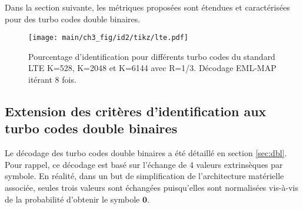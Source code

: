 Dans la section suivante, les métriques proposées sont étendues et caractérisées pour des turbo codes double 
binaires.

\begin{figure}[!h]
	\centering
	\hspace*{-1cm}
	\texttt{[image: main/ch3\_fig/id2/tikz/lte.pdf]}
	\caption{Pourcentage d'identification pour différents turbo codes du standard LTE K=528, K=2048 et K=6144 avec R=1/3.
	Décodage EML-MAP itérant 8 fois. \label{fig:idLTE}}
\end{figure}

\subsection{Extension des critères d'identification aux turbo codes double binaires}
Le décodage des turbo codes double binaires a été détaillé en section \ref{sec:dbl}. Pour rappel, ce décodage est basé
sur l'échange de 4 valeurs extrinsèques par symbole. En réalité, dans un but de simplification de 
l'architecture matérielle associée, seules trois valeurs sont échangées puisqu'elles sont normalisées vis-à-vis de 
la probabilité d'obtenir le symbole $\mathbf{0}$. 

